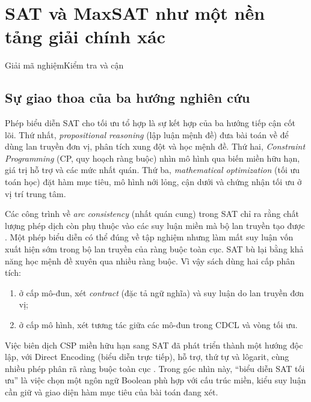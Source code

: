 \chapter{SAT và MaxSAT như một nền tảng giải chính xác}


  {Giải mã nghiệm}{Kiểm tra và cận}

\section{Sự giao thoa của ba hướng nghiên cứu}

Phép biểu diễn SAT cho tối ưu tổ hợp là sự kết hợp của ba hướng tiếp cận cốt lõi. Thứ
nhất, \emph{propositional reasoning} (lập luận mệnh đề) đưa bài toán về \CNF
để dùng lan truyền đơn vị, phân tích xung đột và học mệnh đề. Thứ hai,
\emph{Constraint Programming} (CP, quy hoạch ràng buộc) nhìn mô hình qua biến miền
hữu hạn, giá trị hỗ trợ và các mức nhất quán. Thứ ba,
\emph{mathematical optimization} (tối ưu toán học) đặt hàm mục tiêu, mô hình nới lỏng, cận dưới và
chứng nhận tối ưu ở vị trí trung tâm.

Các công trình về \emph{arc consistency} (nhất quán cung) trong SAT chỉ ra
rằng chất lượng phép dịch còn phụ thuộc vào các suy luận miền mà bộ lan truyền
tạo được \parencite{gent2002arc,bacchus2007gac}. Một phép biểu diễn có thể đúng về
tập nghiệm nhưng làm mất suy luận vốn xuất hiện sớm trong bộ lan truyền của
ràng buộc toàn cục. SAT bù lại bằng khả năng học mệnh đề xuyên qua nhiều ràng
buộc. Vì vậy sách dùng hai cấp phân tích:
\begin{enumerate}
  \item ở cấp mô-đun, xét \emph{contract} (đặc tả ngữ nghĩa) và suy luận do
        lan truyền đơn vị;
  \item ở cấp mô hình, xét tương tác giữa các mô-đun trong CDCL và vòng tối
        ưu.
\end{enumerate}

Việc biên dịch CSP miền hữu hạn sang SAT đã phát triển thành một hướng độc lập,
với Direct Encoding (biểu diễn trực tiếp), hỗ trợ, thứ tự và lôgarit, cùng nhiều phép phân rã ràng
buộc toàn cục \parencite{tamura2009csp,petke2015bridging}. Trong góc nhìn này,
``biểu diễn SAT tối ưu'' là việc chọn một ngôn ngữ Boolean phù hợp với cấu trúc
miền, kiểu suy luận cần giữ và giao diện hàm mục tiêu của bài toán đang xét.

